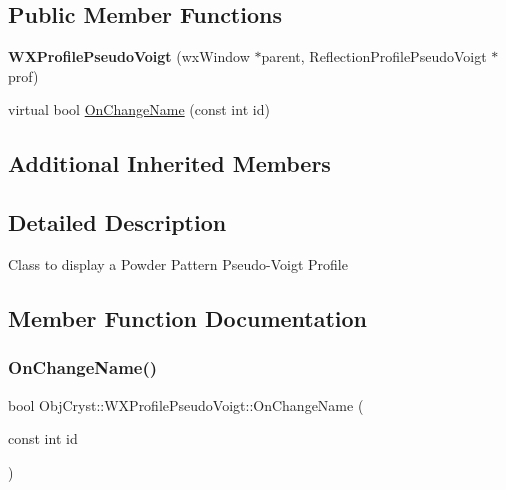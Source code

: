 \subsection*{Public Member Functions}
\begin{DoxyCompactItemize}
\item 
\mbox{\label{class_obj_cryst_1_1_w_x_profile_pseudo_voigt_a56ea943a8f877deb5a22c50f893787ba}} 
{\bfseries W\+X\+Profile\+Pseudo\+Voigt} (wx\+Window $\ast$parent, Reflection\+Profile\+Pseudo\+Voigt $\ast$prof)
\item 
virtual bool \mbox{\hyperlink{class_obj_cryst_1_1_w_x_profile_pseudo_voigt_a6b1ba0fce0c78461e4ea3987893501b2}{On\+Change\+Name}} (const int id)
\end{DoxyCompactItemize}
\subsection*{Additional Inherited Members}


\subsection{Detailed Description}
Class to display a Powder Pattern Pseudo-\/\+Voigt Profile 

\subsection{Member Function Documentation}
\mbox{\label{class_obj_cryst_1_1_w_x_profile_pseudo_voigt_a6b1ba0fce0c78461e4ea3987893501b2}} 
\subsubsection{\texorpdfstring{OnChangeName()}{OnChangeName()}}
{\footnotesize\ttfamily bool Obj\+Cryst\+::\+W\+X\+Profile\+Pseudo\+Voigt\+::\+On\+Change\+Name (\begin{DoxyParamCaption}\item[{const int}]{id }\end{DoxyParamCaption})\hspace{0.3cm}{\ttfamily [virtual]}}

